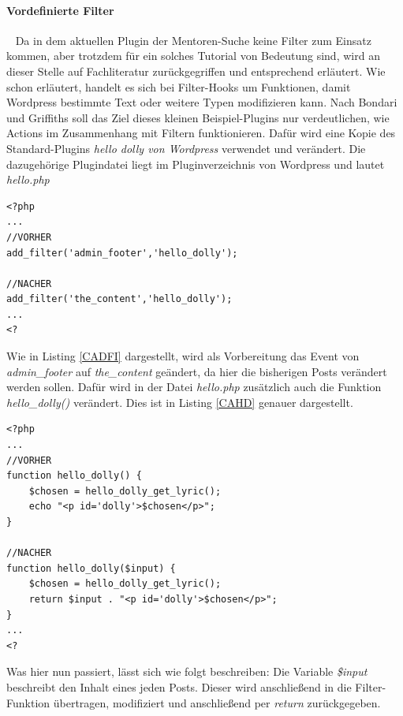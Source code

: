 \paragraph{Vordefinierte Filter}\ \newline
Da in dem aktuellen Plugin der Mentoren-Suche keine Filter zum Einsatz kommen, aber trotzdem für ein solches Tutorial von Bedeutung sind, wird an dieser Stelle auf Fachliteratur zurückgegriffen und entsprechend erläutert. \newline
Wie schon erläutert, handelt es sich bei Filter-Hooks um Funktionen, damit Wordpress bestimmte Text oder weitere Typen modifizieren kann.\newline
Nach Bondari und Griffiths soll das Ziel dieses kleinen Beispiel-Plugins nur verdeutlichen, wie Actions im Zusammenhang mit Filtern funktionieren. Dafür wird eine Kopie des Standard-Plugins \emph{hello dolly von Wordpress} verwendet und verändert. \newline
Die dazugehörige Plugindatei liegt im Pluginverzeichnis von Wordpress und lautet \emph{hello.php}
\begin{lstlisting}
<?php
...
//VORHER
add_filter('admin_footer','hello_dolly');

//NACHER
add_filter('the_content','hello_dolly');
...
<?
\end{lstlisting}
Wie in Listing \ref{CADFI} dargestellt, wird als Vorbereitung das Event von \emph{admin\_footer} auf \emph{the\_content} geändert, da hier die bisherigen Posts verändert werden sollen.\newline
Dafür wird in der Datei \emph{hello.php} zusätzlich auch die Funktion \emph{hello\_dolly()} verändert. \newline
Dies ist in Listing \ref{CAHD} genauer dargestellt.
\begin{lstlisting}
<?php
...
//VORHER
function hello_dolly() {
	$chosen = hello_dolly_get_lyric();
	echo "<p id='dolly'>$chosen</p>";
}

//NACHER
function hello_dolly($input) {
	$chosen = hello_dolly_get_lyric();
	return $input . "<p id='dolly'>$chosen</p>";
}
...
<?
\end{lstlisting}
Was hier nun passiert, lässt sich wie folgt beschreiben: Die Variable \emph{\$input} beschreibt den Inhalt eines jeden Posts. Dieser wird anschließend in die Filter-Funktion übertragen, modifiziert und anschließend per \emph{return} zurückgegeben.\newline
